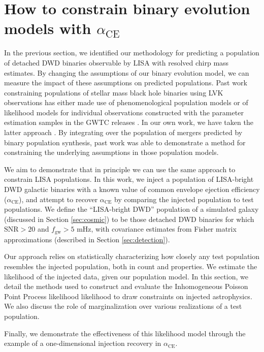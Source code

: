 \documentclass[twocolumn]{aastex631}
\newcommand*{\fgw}{f_{\mathrm{gw}}}
\newcommand*{\alphaCE}{\alpha_{\mathrm{CE}}}
\begin{document}
 \section{How to constrain binary evolution models with $\alphaCE$}
\label{sec:likelihood}
In the previous section, we identified our methodology for
    predicting a population of detached DWD binaries observable
    by LISA with resolved chirp mass estimates.
By changing the assumptions of our binary evolution model,
    we can measure the impact of these assumptions on 
    predicted populations.
Past work constraining populations of stellar mass black hole binaries
    using LVK observations has either made use of 
    phenomenological population models
    or of likelihood models for individual observations
    constructed with the parameter estimation samples in the GWTC releases
    \citep{GWTC-1, GWTC-2, GWTC-2p1, GWTC-3, GWTC-2p1-Zenodo, GWTC-3-Zenodo,
    nal-chieff-paper, nal-methods-paper}.
In our own work, we have taken the latter approach
    \citep{st_inference_interp}.
By integrating over the population of mergers predicted by binary population
    synthesis, past work was able to demonstrate a method for
    constraining the underlying assumptions in those population models.

We aim to demonstrate that in principle
    we can use the same approach to constrain LISA populations.
In this work, we inject a population of LISA-bright DWD galactic binaries
    with a known value of common envelope ejection efficiency ($\alphaCE$),
    and attempt to recover $\alphaCE$
    by comparing the injected population to test populations.
We define the ``LISA-bright DWD'' population of a simulated galaxy
    (discussed in Section \ref{sec:cosmic})
    to be those detached DWD binaries for which
    $\mathrm{SNR} > 20$ and $\fgw > 5$ mHz,
    with covariance estimates from Fisher matrix approximations
    (described in Section \ref{sec:detection}).

Our approach relies on statistically characterizing how
    closely any test population resembles the injected population,
    both in count and properties.
We estimate the likelihood of the injected data,
    given our population model.   
In this section, we detail the methods used to construct
    and evaluate the Inhomogeneous Poisson Point Process likelihood 
    likelihood to draw constraints on injected astrophysics.
We also discuss the role of marginalization
    over various realizations of a test population.

Finally, we demonstrate the effectiveness
    of this likelihood model through the example of
    a one-dimensional injection recovery in $\alphaCE$.
\end{document}
